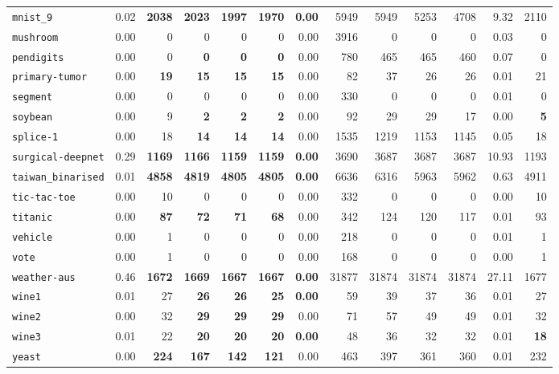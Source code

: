 \begin{tabular}{lrrrrrrrrrrrr}
\texttt{mnist\_9} & 0.02 & \textbf{2038} & \textbf{2023} & \textbf{1997} & \textbf{1970} & \textbf{0.00} & 5949 & 5949 & 5253 & 4708 & 9.32 & 2110\\
\texttt{mushroom} & 0.00 & 0 & 0 & 0 & 0 & 0.00 & 3916 & 0 & 0 & 0 & 0.03 & 0\\
\texttt{pendigits} & 0.00 & 0 & \textbf{0} & \textbf{0} & \textbf{0} & 0.00 & 780 & 465 & 465 & 460 & 0.07 & 0\\
\texttt{primary-tumor} & 0.00 & \textbf{19} & \textbf{15} & \textbf{15} & \textbf{15} & 0.00 & 82 & 37 & 26 & 26 & 0.01 & 21\\
\texttt{segment} & 0.00 & 0 & 0 & 0 & 0 & 0.00 & 330 & 0 & 0 & 0 & 0.01 & 0\\
\texttt{soybean} & 0.00 & 9 & \textbf{2} & \textbf{2} & \textbf{2} & 0.00 & 92 & 29 & 29 & 17 & 0.00 & \textbf{5}\\
\texttt{splice-1} & 0.00 & 18 & \textbf{14} & \textbf{14} & \textbf{14} & 0.00 & 1535 & 1219 & 1153 & 1145 & 0.05 & 18\\
\texttt{surgical-deepnet} & 0.29 & \textbf{1169} & \textbf{1166} & \textbf{1159} & \textbf{1159} & \textbf{0.00} & 3690 & 3687 & 3687 & 3687 & 10.93 & 1193\\
\texttt{taiwan\_binarised} & 0.01 & \textbf{4858} & \textbf{4819} & \textbf{4805} & \textbf{4805} & \textbf{0.00} & 6636 & 6316 & 5963 & 5962 & 0.63 & 4911\\
\texttt{tic-tac-toe} & 0.00 & 10 & 0 & 0 & 0 & 0.00 & 332 & 0 & 0 & 0 & 0.00 & 10\\
\texttt{titanic} & 0.00 & \textbf{87} & \textbf{72} & \textbf{71} & \textbf{68} & 0.00 & 342 & 124 & 120 & 117 & 0.01 & 93\\
\texttt{vehicle} & 0.00 & 1 & 0 & 0 & 0 & 0.00 & 218 & 0 & 0 & 0 & 0.01 & 1\\
\texttt{vote} & 0.00 & 1 & 0 & 0 & 0 & 0.00 & 168 & 0 & 0 & 0 & 0.00 & 1\\
\texttt{weather-aus} & 0.46 & \textbf{1672} & \textbf{1669} & \textbf{1667} & \textbf{1667} & \textbf{0.00} & 31877 & 31874 & 31874 & 31874 & 27.11 & 1677\\
\texttt{wine1} & 0.01 & 27 & \textbf{26} & \textbf{26} & \textbf{25} & \textbf{0.00} & 59 & 39 & 37 & 36 & 0.01 & 27\\
\texttt{wine2} & 0.00 & 32 & \textbf{29} & \textbf{29} & \textbf{29} & 0.00 & 71 & 57 & 49 & 49 & 0.01 & 32\\
\texttt{wine3} & 0.01 & 22 & \textbf{20} & \textbf{20} & \textbf{20} & \textbf{0.00} & 48 & 36 & 32 & 32 & 0.01 & \textbf{18}\\
\texttt{yeast} & 0.00 & \textbf{224} & \textbf{167} & \textbf{142} & \textbf{121} & 0.00 & 463 & 397 & 361 & 360 & 0.01 & 232\\
\bottomrule
\end{tabular}

